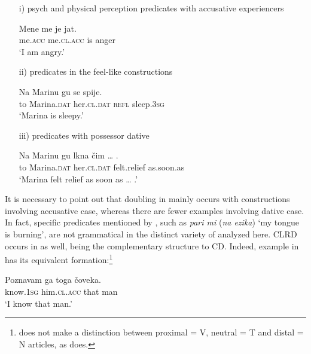 \documentclass[output=paper,
colorlinks,
citecolor=brown,
newtxmath
]{langscibook}
\begin{document}
\begin{itemize}
\item[i)] psych and physical perception predicates with accusative experiencers


\ea\label{ex:zivojinovic:11}
\gll Mene   me        je  jat.\\
     me.\textsc{acc} me.\textsc{cl.acc} is  anger \\
\glt `I am angry.'
\z
\item[ii)] predicates in the feel-like constructions


\ea\label{ex:zivojinovic:12}
\gll Na Marinu     gu         se spije.\\
     to Marina.\textsc{dat} her.\textsc{cl.dat} \textsc{refl} sleep.\textsc{3sg}\\
\glt `Marina is sleepy.'
\z

\item[iii)] predicates with possessor dative


\ea\label{ex:zivojinovic:13}
\gll Na Marinu     gu         lkna      čim {\dots} .\\
     to Marina.\textsc{dat} her.\textsc{cl.dat} {felt.relief} {as.soon.as}\\
\glt `Marina felt relief as soon as {\dots} .'
\z

\end{itemize}

\noindent It is necessary to point out that doubling in  mainly occurs with constructions involving accusative case, whereas there are fewer examples involving dative case. In fact, specific predicates mentioned by \citet{Cinque.Krapova2008}, such as \textit{pari mi} (\textit{na ezika}) `my tongue is burning', are not grammatical in the distinct variety of  analyzed here.
CLRD occurs in  as well, being the complementary structure to CD. Indeed, example  in  has its equivalent formation:\footnote{ does not make a distinction between proximal = V, neutral = T and distal = N articles, as  does.}


\ea\label{ex:zivojinovic:14}
\gll Poznavam ga          toga čoveka.\\
     know.\textsc{1sg} him.\textsc{cl.acc} that man \\
\glt `I know that man.'
\z
\end{document}
